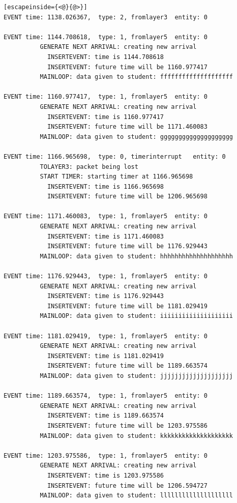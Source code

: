 \documentclass[paper=a4, fontsize=11pt]{scrartcl}
\numberwithin{equation}{section}		%
\numberwithin{figure}{section}			%
\numberwithin{table}{section}				%
\begin{document}
\begin{lstlisting}[escapeinside={<@}{@>}]
EVENT time: 1138.026367,  type: 2, fromlayer3  entity: 0

EVENT time: 1144.708618,  type: 1, fromlayer5  entity: 0
          GENERATE NEXT ARRIVAL: creating new arrival
            INSERTEVENT: time is 1144.708618
            INSERTEVENT: future time will be 1160.977417
          MAINLOOP: data given to student: ffffffffffffffffffff

EVENT time: 1160.977417,  type: 1, fromlayer5  entity: 0
          GENERATE NEXT ARRIVAL: creating new arrival
            INSERTEVENT: time is 1160.977417
            INSERTEVENT: future time will be 1171.460083
          MAINLOOP: data given to student: gggggggggggggggggggg

EVENT time: 1166.965698,  type: 0, timerinterrupt   entity: 0
          TOLAYER3: packet being lost
          START TIMER: starting timer at 1166.965698
            INSERTEVENT: time is 1166.965698
            INSERTEVENT: future time will be 1206.965698

EVENT time: 1171.460083,  type: 1, fromlayer5  entity: 0
          GENERATE NEXT ARRIVAL: creating new arrival
            INSERTEVENT: time is 1171.460083
            INSERTEVENT: future time will be 1176.929443
          MAINLOOP: data given to student: hhhhhhhhhhhhhhhhhhhh

EVENT time: 1176.929443,  type: 1, fromlayer5  entity: 0
          GENERATE NEXT ARRIVAL: creating new arrival
            INSERTEVENT: time is 1176.929443
            INSERTEVENT: future time will be 1181.029419
          MAINLOOP: data given to student: iiiiiiiiiiiiiiiiiiii

EVENT time: 1181.029419,  type: 1, fromlayer5  entity: 0
          GENERATE NEXT ARRIVAL: creating new arrival
            INSERTEVENT: time is 1181.029419
            INSERTEVENT: future time will be 1189.663574
          MAINLOOP: data given to student: jjjjjjjjjjjjjjjjjjjj

EVENT time: 1189.663574,  type: 1, fromlayer5  entity: 0
          GENERATE NEXT ARRIVAL: creating new arrival
            INSERTEVENT: time is 1189.663574
            INSERTEVENT: future time will be 1203.975586
          MAINLOOP: data given to student: kkkkkkkkkkkkkkkkkkkk

EVENT time: 1203.975586,  type: 1, fromlayer5  entity: 0
          GENERATE NEXT ARRIVAL: creating new arrival
            INSERTEVENT: time is 1203.975586
            INSERTEVENT: future time will be 1206.594727
          MAINLOOP: data given to student: llllllllllllllllllll


\end{lstlisting}
\end{document}
